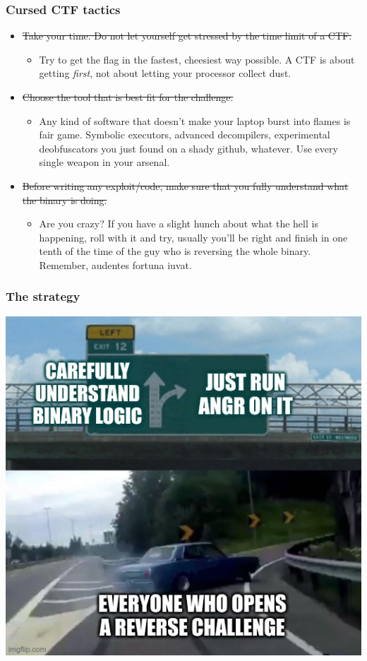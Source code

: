 \documentclass[aspectratio=169]{beamer}
\begin{document}
\begin{frame}[fragile]
	\frametitle{Cursed CTF tactics}
	\begin{itemize}
		\item \sout{Take your time. Do not let yourself get stressed by the time limit of a CTF.}
		\begin{itemize}
			\item Try to get the flag in the fastest, cheesiest way possible. A CTF is about getting \emph{first}, not about letting your processor collect dust.
		\end{itemize}
		\item \sout{Choose the tool that is best fit for the challenge.}
		\begin{itemize}
		\item Any kind of software that doesn't make your laptop burst into flames is fair game. Symbolic executors, advanced decompilers, experimental deobfuscators you just found on a shady github, whatever. Use every single weapon in your arsenal.
		\end{itemize}
		\item \sout{Before writing any exploit/code, make sure that you fully understand what the binary is doing.}
		\begin{itemize}
		\item Are you crazy? If you have a slight hunch about what the hell is happening, roll with it and try, usually you'll be right and finish in one tenth of the time of the guy who is reversing the whole binary. Remember, audentes fortuna iuvat.
		\end{itemize}
	\end{itemize}
\end{frame}

\begin{frame}[fragile]
	\frametitle{The strategy}
	\begin{center}
	\includegraphics[scale=0.4]{angr_meme.jpg}
	\end{center}
\end{frame}
\end{document}
